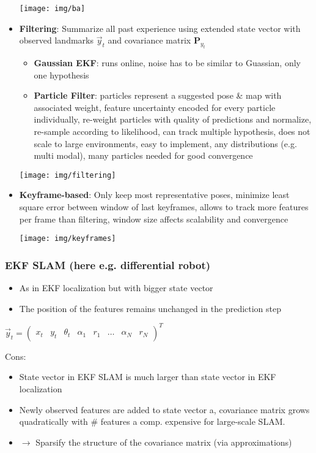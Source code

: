 \documentclass[fontsize=6pt]{scrartcl}
\newcommand{\mat}[1]{\mathbf{#1}}
\begin{document}
\begin{multicols*}{4}
\begin{itemize}
	{\centering
		\texttt{[image: img/ba]}
	\par}
	
	\item \textbf{Filtering}:
	Summarize all past experience using extended state vector with observed landmarks $\vec y_t$ and covariance matrix $\mat P_{y_t}$
	\begin{itemize}
		\item \textbf{Gaussian EKF}: runs online, noise has to be similar to Guassian, only one hypothesis
		\item \textbf{Particle Filter}: particles represent a suggested pose \& map with associated weight, feature uncertainty encoded for every particle individually, re-weight particles with quality of predictions and normalize, re-sample according to likelihood, can track multiple hypothesis, does not scale to large environments, easy to implement, any distributions (e.g. multi modal), many particles needed for good convergence
	\end{itemize}	
	{\centering
		\texttt{[image: img/filtering]}
	\par}
	\item \textbf{Keyframe-based}: Only keep most representative poses, minimize least square error between window of last keyframes,	allows to track more features per frame than filtering,	window size affects scalability and convergence	
	
	{\centering
		\texttt{[image: img/keyframes]}
	\par}
\end{itemize}

\subsubsection*{EKF SLAM (here e.g. differential robot)}
\begin{itemize}
	\item As in EKF localization but with bigger state vector
	\item The position of the features remains unchanged in the prediction step
\end{itemize}
{\centering 
	$\vec y_t =
	\begin{pmatrix}
	x_t & y_t&\theta_t&\alpha_1&r_1&\ldots&\alpha_N&r_N
	\end{pmatrix}^T
	$
\par}

Cons: 
\begin{itemize}
\item State vector in EKF SLAM is much larger than state vector in EKF localization
\item Newly observed features are added to state vector a, covariance matrix grows quadratically with \# features a comp. expensive for large-scale SLAM.
\item $\rightarrow$ Sparsify the structure of the covariance matrix (via approximations)
\end{itemize}


\end{multicols*}
\end{document}
